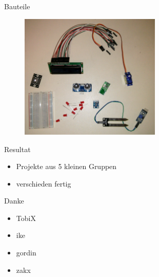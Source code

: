 \documentclass[ngerman,compress]{beamer}
\begin{document}
\begin{frame}{Bauteile}
	\begin{figure}[h]
		\centering
		\includegraphics[width=0.6\textwidth]{bauteile.jpg}
	\end{figure}
\end{frame}

\begin{frame}{Resultat}
	\begin{itemize}
		\item Projekte aus 5 kleinen Gruppen
		\item verschieden fertig
	\end{itemize}
	\begin{center}
	\end{center}
\end{frame}

\begin{frame}{Danke}
	\begin{center}
	\end{center}
	\begin{itemize}
		\item TobiX
		\item ike
		\item gordin
		\item zakx
	\end{itemize}
\end{frame}
\end{document}
